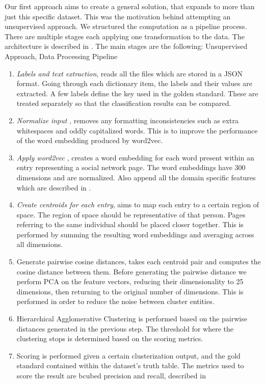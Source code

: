 Our first approach aims to create a general solution, that expands to more than
just this specific dataset. This was the motivation behind attempting an unsupervised
approach. We structured the computation as a pipeline process. There are multiple
stages each applying one transformation to the data. The architecture is described in
.
The main stages are the following:
                {Unsupervised Approach, Data Processing Pipeline}
\begin{enumerate}
\item {\em Labels and text extraction}, reads all the files which are stored in
a JSON format. Going through each dictionary item, the labels and their values
are extracted. A few labels define the key used in the golden standard.
These are treated separately so that the classification results can be compared.
\item {\em Normalize input }, removes any formatting inconsistencies such as
extra whitespaces and oddly capitalized words. This is to improve the performance
of the word embedding produced by word2vec.
\item {\em Apply word2vec }, creates a word embedding for each word present
within an entry representing a social network page. The word embeddings have
300 dimensions and are normalized. Also append all the domain specific features
which are described in .
\item {\em Create centroids for each entry}, aims to map each entry to a certain
region of space. The region of space should be representative of that person.
Pages referring to the same individual should be placed closer together.
This is performed by summing the resulting word embeddings and
averaging across all dimensions.
\item {Generate pairwise cosine distances}, takes each centroid pair and
computes the cosine distance between them. Before generating the pairwise distance
we perform PCA on the feature vectors, reducing their dimensionality to 25 dimensions,
then returning to the original number of dimensions. This is performed in order
to reduce the noise between cluster entities.
\item {Hierarchical Agglomerative Clustering} is performed based on the pairwise
distances generated in the previous step. The threshold for where the clustering
stops is determined based on the scoring metrics.
\item {Scoring} is performed given a certain clusterization output, and the
gold standard contained within the dataset’s truth table.
The metrics used to score the result are bcubed precision and recall, described
in 
\end{enumerate}

